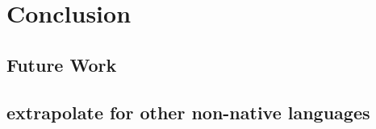 \documentclass[final_report.tex]{subfiles}
\begin{document}
\section{Conclusion}

\subsection{Future Work}

\subsection{extrapolate for other non-native languages}
\end{document}
